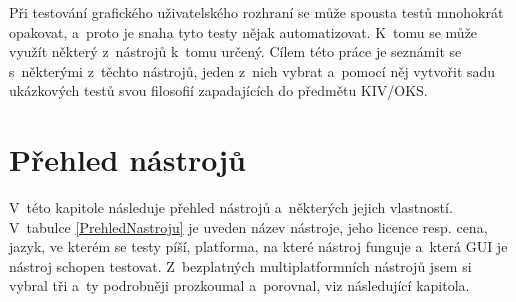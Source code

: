 \documentclass{bakalarka}
\begin{document}
Při testování grafického uživatelského rozhraní se může spousta testů mnohokrát opakovat, a~proto je snaha tyto testy nějak automatizovat. K~tomu se může využít některý z~nástrojů k~tomu určený. Cílem této práce je seznámit se s~některými z~těchto nástrojů, jeden z~nich vybrat a~pomocí něj vytvořit sadu ukázkových testů svou filosofií zapadajících do předmětu KIV/OKS.

\chapter{Přehled nástrojů}
V~této kapitole následuje přehled nástrojů a~některých jejich vlastností. V~tabulce \ref{PrehledNastroju} je uveden název nástroje, jeho licence resp. cena, jazyk, ve kterém se testy píší, platforma, na které nástroj funguje a~která GUI je nástroj schopen testovat. Z~bezplatných multiplatformních nástrojů jsem si vybral tři a~ty podrobněji prozkoumal a~porovnal, viz následující kapitola.
\end{document}
